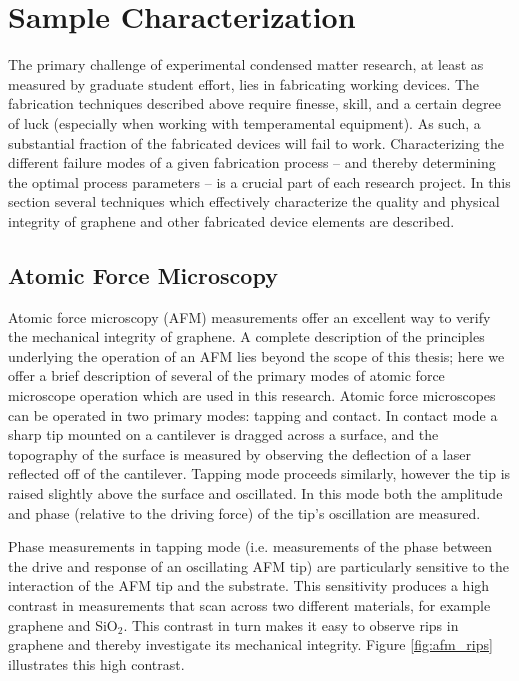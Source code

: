 \documentclass[edeposit,fullpage,draftthesis]{uiucthesis2009}
\begin{document}
    \section{Sample Characterization}
    
    The primary challenge of experimental condensed matter research, at least as measured by graduate student effort, lies in fabricating working devices. The fabrication techniques described above require finesse, skill, and a certain degree of luck (especially when working with temperamental equipment). As such, a substantial fraction of the fabricated devices will fail to work. Characterizing the different failure modes of a given fabrication process -- and thereby determining the optimal process parameters -- is a crucial part of each research project. In this section several techniques which effectively characterize the quality and physical integrity of graphene and other fabricated device elements are described.
    
        \subsection{Atomic Force Microscopy}
        
        Atomic force microscopy (AFM) measurements offer an excellent way to verify the mechanical integrity
        of graphene. A complete description of the principles underlying the operation of an AFM lies beyond
        the scope of this thesis; here we offer a brief description of several of the primary modes of 
        atomic force microscope operation which are used in this research.
        Atomic force microscopes can be operated in two primary modes: tapping and contact.
        In contact mode a sharp tip mounted on a cantilever is dragged across a surface, and the 
        topography of the surface is measured by observing the deflection of a laser reflected off of the cantilever.
        Tapping mode proceeds similarly, however the tip is raised slightly above the surface and oscillated.
        In this mode both the amplitude and phase (relative to the driving force) of the tip's oscillation are measured.
        
        Phase measurements in tapping mode (i.e. measurements of the phase between the drive
        and response of an oscillating AFM tip) are particularly sensitive to the interaction of the AFM tip and 
        the substrate. This sensitivity produces a high contrast in measurements that scan across two different materials,
        for example graphene and SiO$_2$. This contrast in turn makes it easy to observe rips in graphene
        and thereby investigate its mechanical integrity. Figure \ref{fig:afm_rips} illustrates this high contrast.
        
\end{document}
